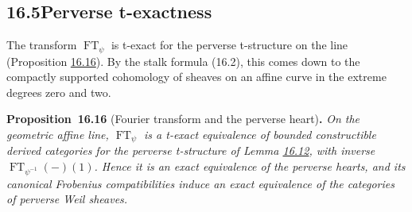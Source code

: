 \documentclass[11pt]{article}
\newenvironment{bpstatement}[2]{\par\addvspace{0.6\baselineskip}\noindent\textbf{#1}#2\textbf{.}\enspace\ignorespaces}
  {\par\addvspace{0.4\baselineskip}}
\newenvironment{bpstatementit}[2]{\begin{bpstatement}{#1}{#2}\itshape\ignorespaces}{\end{bpstatement}}
\begin{document}
\subsection*{\texorpdfstring{16.5\quad Perverse t-exactness}{16.5 Perverse t-exactness}}
\label{bp212}%
\label{bp213}%
The transform \(\operatorname{FT}_\psi\) is t-exact for the perverse t-structure on the line (Proposition \hyperref[bp214]{16.16}). By the stalk formula (16.2), this comes down to the compactly supported cohomology of sheaves on an affine curve in the extreme degrees zero and two.

\label{bp214}%
\begin{bpstatementit}{Proposition~16.16}{ (Fourier transform and the perverse heart)}
On the geometric affine line, \(\operatorname{FT}_\psi\) is a t-exact equivalence of bounded constructible derived categories for the perverse t-structure of Lemma \hyperref[bp203]{16.12}, with inverse \(\operatorname{FT}_{\psi^{-1}}(-)(1)\). Hence it is an exact equivalence of the perverse hearts, and its canonical Frobenius compatibilities induce an exact equivalence of the categories of perverse Weil sheaves.
\end{bpstatementit}
\end{document}
